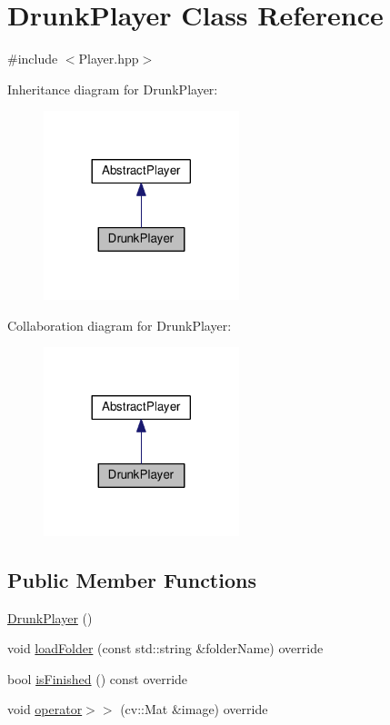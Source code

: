 \hypertarget{classDrunkPlayer}{\section{Drunk\+Player Class Reference}
\label{classDrunkPlayer}
}


{\ttfamily \#include $<$Player.\+hpp$>$}



Inheritance diagram for Drunk\+Player\+:\nopagebreak
\begin{figure}[H]
\begin{center}
\leavevmode
\includegraphics[width=161pt]{classDrunkPlayer__inherit__graph}
\end{center}
\end{figure}


Collaboration diagram for Drunk\+Player\+:\nopagebreak
\begin{figure}[H]
\begin{center}
\leavevmode
\includegraphics[width=161pt]{classDrunkPlayer__coll__graph}
\end{center}
\end{figure}
\subsection*{Public Member Functions}
\begin{DoxyCompactItemize}
\item 
\hyperlink{classDrunkPlayer_a39c64a774a19456f3a4c194ec5e1131f}{Drunk\+Player} ()
\item 
void \hyperlink{classDrunkPlayer_a235e60ea8a97c4d26277b066c2cebe80}{load\+Folder} (const std\+::string \&folder\+Name) override
\item 
bool \hyperlink{classDrunkPlayer_a9c032dda7df01fafc757fb1f4e265bb4}{is\+Finished} () const override
\item 
void \hyperlink{classDrunkPlayer_a2662f5010e15c95ca6639f56f012aed1}{operator$>$$>$} (cv\+::\+Mat \&image) override
\end{DoxyCompactItemize}
